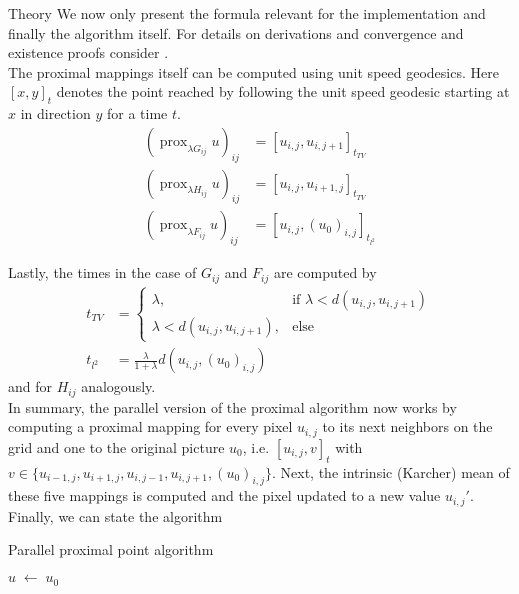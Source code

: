 \begin{chapter}{Theory}
We now only present the formula relevant for the implementation and finally the algorithm itself. For details on derivations and convergence and existence proofs consider \cite{Weinmann}.\\

The proximal mappings itself can be computed using unit speed geodesics. Here $[x,y]_t$ denotes the point reached by
following the unit speed geodesic starting at $x$ in direction $y$ for a time $t$.
\begin{align}
    (\operatorname{prox}_{\lambda G_{ij}}u)_{ij}&=[u_{i,j},u_{i,j+1}]_{t_{TV}} \\
    (\operatorname{prox}_{\lambda H_{ij}}u)_{ij}&=[u_{i,j},u_{i+1,j}]_{t_{TV}} \\
    (\operatorname{prox}_{\lambda F_{ij}}u)_{ij}&=[u_{i,j},(u_0)_{i,j}]_{t_{l^2}}
\end{align}

Lastly, the times in the case of $G_{ij}$ and $F_{ij}$ are computed by
\begin{align}
    t_{TV}&=
    \begin{cases}
	\lambda, &\text{if } \lambda<d(u_{i,j},u_{i,j+1})\\
	\lambda<d(u_{i,j},u_{i,j+1}), & \text{else}
    \end{cases}\\
    t_{l^{2}}&=\frac{\lambda}{1+\lambda}d(u_{i,j},(u_0)_{i,j})
\end{align}
and for $H_{ij}$ analogously.\\

In summary, the parallel version of the proximal algorithm now works by computing a proximal mapping for every pixel $u_{i,j}$ to its next neighbors on the grid and one
to the original picture $u_0$, i.e. $[u_{i,j}, v]_t$ with $v\in\lbrace u_{i-1,j},u_{i+1,j},u_{i,j-1}, u_{i,j+1}, (u_0)_{i,j}\rbrace$. Next, the intrinsic (Karcher) mean \cite{Karcher} of 
these five mappings is computed and the pixel updated to a new value $u_{i,j}'$.\\

Finally, we can state the algorithm

\begin{algorithm}
\caption{Parallel proximal point algorithm}
\label{eq:parallel_prpt}
\begin{algorithmic}
    \STATE $u\; \leftarrow\;u_0$
\end{algorithmic}
\end{algorithm}


\end{chapter}
